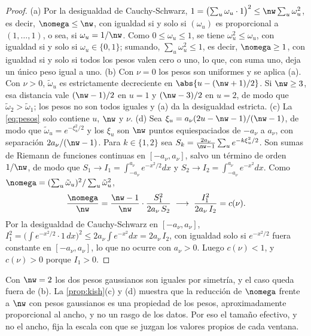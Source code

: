 \begin{proof}
(a) Por la desigualdad de Cauchy-Schwarz,
$1=\bigl(\sum_u\omega_u\cdot1\bigr)^2\le\nw\sum_u\omega_u^2$, es decir, $\nomega\le\nw$, con
igualdad si y solo si $(\omega_u)$ es proporcional a $(1,\dots,1)$, o sea, si $\omega_u=1/\nw$.
Como $0\le\omega_u\le1$, se tiene $\omega_u^2\le\omega_u$, con igualdad si y solo si
$\omega_u\in\{0, 1\}$; sumando, $\sum_u\omega_u^2\le1$, es decir, $\nomega\ge1$, con igualdad si y
solo si todos los pesos valen cero o uno, lo que, con suma uno, deja un único peso igual a uno.
(b) Con $\nu=0$ los pesos son uniformes y se aplica (a). Con $\nu>0$, $\tilde\omega_u$ es
estrictamente decreciente en $\abs{u-(\nw+1)/2}$. Si $\nw\ge3$, esa distancia vale $(\nw-1)/2$ en
$u=1$ y $(\nw-3)/2$ en $u=2$, de modo que $\tilde\omega_2>\tilde\omega_1$; los pesos no son todos
iguales y (a) da la desigualdad estricta. (c) La \cref{eq:pesos} solo contiene $u$, $\nw$ y $\nu$.
(d) Sea $\xi_u=a_\nu(2u-\nw-1)/(\nw-1)$, de modo que $\tilde\omega_u=e^{-\xi_u^2/2}$ y los $\xi_u$ son
$\nw$ puntos equiespaciados de $-a_\nu$ a $a_\nu$, con separación $2a_\nu/(\nw-1)$. Para $k\in\{1, 2\}$ sea
$S_k=\frac{2a_\nu}{\nw-1}\sum_u e^{-k\xi_u^2/2}$. Son sumas de Riemann de funciones continuas en
$[-a_\nu,a_\nu]$, salvo un término de orden $1/\nw$, de modo que $S_1\to I_1=\int_{-a_\nu}^{a_\nu}e^{-x^2/2}dx$ y
$S_2\to I_2=\int_{-a_\nu}^{a_\nu}e^{-x^2}dx$. Como $\nomega=(\sum_u\tilde\omega_u)^2/\sum_u\tilde\omega_u^2$,
\[
  \frac{\nomega}{\nw}=\frac{\nw-1}{\nw}\cdot\frac{S_1^2}{2a_\nu\,S_2}\;\longrightarrow\;
  \frac{I_1^2}{2a_\nu\,I_2}=c(\nu).
\]
Por la desigualdad de Cauchy-Schwarz en $[-a_\nu,a_\nu]$,
$I_1^2=\bigl(\int e^{-x^2/2}\cdot1\,dx\bigr)^2\le2a_\nu\int e^{-x^2}dx=2a_\nu\,I_2$, con igualdad solo si
$e^{-x^2/2}$ fuera constante en $[-a_\nu,a_\nu]$, lo que no ocurre con $a_\nu>0$. Luego $c(\nu)<1$, y
$c(\nu)>0$ porque $I_1>0$.
\end{proof}

Con $\nw=2$ los dos pesos gaussianos son iguales por simetría, y el caso queda fuera de (b). La
\cref{prop:kish}(c) y (d) muestra que la reducción de $\nomega$ frente a $\nw$ con pesos
gaussianos es una propiedad de los pesos, aproximadamente proporcional al ancho, y no un rasgo de
los datos. Por eso el tamaño efectivo, y no el ancho, fija la escala con que se juzgan los
valores propios de cada ventana.


